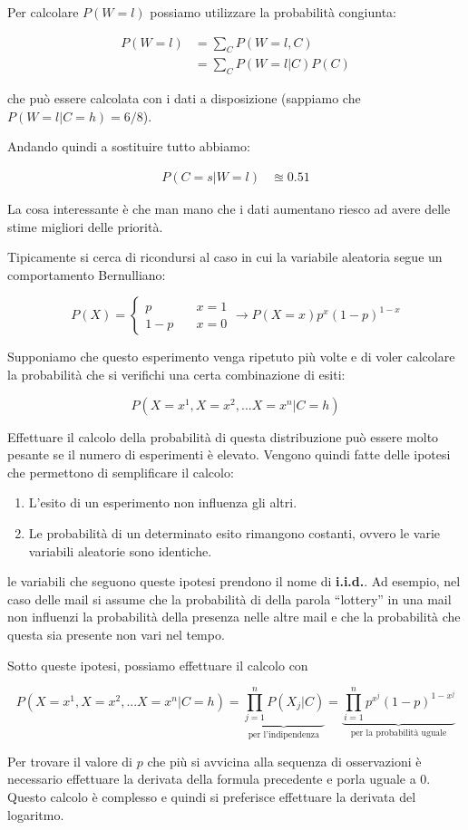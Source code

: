 Per calcolare $P(W = l)$ possiamo utilizzare la probabilità congiunta:

\begin{align*}
	P(W = l)&= \sum\limits_{C} P(W = l, C) \\
			&= \sum\limits_{C} P(W = l | C)P(C)
\end{align*}

\noindent che può essere calcolata con i dati a disposizione (sappiamo che $P(W = l | C = h) = 6/8$).

Andando quindi a sostituire tutto abbiamo:

\begin{align*}
	P(C = s | W = l) &\approxeq 0.51
\end{align*}

\noindent La cosa interessante è che man mano che i dati aumentano riesco ad avere delle stime migliori delle priorità.

Tipicamente si cerca di ricondursi al caso in cui la variabile aleatoria segue un comportamento Bernulliano:

$$
P(X) = \begin{cases}
p \quad& x= 1 \\
1-p \quad& x=0
\end{cases} \rightarrow P(X = x) p^x(1-p)^{1-x}
$$

\noindent Supponiamo che questo esperimento venga ripetuto più volte e di voler calcolare la probabilità che si verifichi una certa combinazione di esiti:

$$
P(X = x^1, X=x^2, ... X = x^n | C = h)
$$

\noindent Effettuare il calcolo della probabilità di questa distribuzione può essere molto pesante se il numero di esperimenti è elevato.
Vengono quindi fatte delle ipotesi che permettono di semplificare il calcolo:

\begin{enumerate}
	\item L'esito di un esperimento non influenza gli altri.
	\item Le probabilità di un determinato esito rimangono costanti, ovvero le varie variabili aleatorie sono identiche.
\end{enumerate}

\noindent le variabili che seguono queste ipotesi prendono il nome di \textbf{i.i.d.}.
Ad esempio, nel caso delle mail si assume che la probabilità di della parola ``lottery'' in una mail non influenzi la probabilità della presenza nelle altre mail e che la probabilità che questa sia presente non vari nel tempo.

Sotto queste ipotesi, possiamo effettuare il calcolo con

$$
P(X = x^1, X=x^2, ... X = x^n | C = h) = \underbrace{\prod\limits_{j = 1}^{n} P(X_j | C)}_{\text{per l'indipendenza}} = \underbrace{\prod\limits_{i = 1}^{n} p^{x^j}(1-p)^{1-{x^j}}}_{\text{per la probabilità uguale}}
$$

\noindent Per trovare il valore di $p$ che più si avvicina alla sequenza di osservazioni è necessario effettuare la derivata della formula precedente e porla uguale a 0. Questo calcolo è complesso e quindi si preferisce effettuare la derivata del logaritmo.

